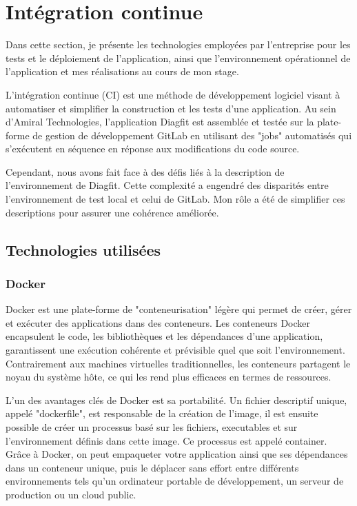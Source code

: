 \newpage
\section{Intégration continue}
Dans cette section, je présente les technologies employées par l'entreprise pour les tests et le déploiement de l'application, ainsi que l'environnement opérationnel de l'application et mes réalisations au cours de mon stage.

L'intégration continue (CI) est une méthode de développement logiciel visant à automatiser et simplifier la construction et les tests d'une application.
Au sein d'Amiral Technologies, l'application Diagfit est assemblée et testée sur la plate-forme de gestion de développement GitLab en utilisant des "jobs" automatisés qui s'exécutent en séquence en réponse aux modifications du code source.

Cependant, nous avons fait face à des défis liés à la description de l'environnement de Diagfit.
Cette complexité a engendré des disparités entre l'environnement de test local et celui de GitLab.
Mon rôle a été de simplifier ces descriptions pour assurer une cohérence améliorée.


\subsection{Technologies utilisées}
\subsubsection{Docker}
Docker est une plate-forme de "conteneurisation" légère qui permet de créer, gérer et exécuter des applications dans des conteneurs.
Les conteneurs Docker encapsulent le code, les bibliothèques et les dépendances d'une application, garantissent une exécution cohérente et prévisible quel que soit l'environnement.
Contrairement aux machines virtuelles traditionnelles, les conteneurs partagent le noyau du système hôte, ce qui les rend plus efficaces en termes de ressources.

L'un des avantages clés de Docker est sa portabilité.
Un fichier descriptif unique, appelé "dockerfile", est responsable de la création de l'image, il est ensuite possible de créer un processus basé sur les fichiers, executables et sur l'environnement définis dans cette image.
Ce processus est appelé container.
Grâce à Docker, on peut empaqueter votre application ainsi que ses dépendances dans un conteneur unique, puis le déplacer sans effort entre différents environnements tels qu'un ordinateur portable de développement, un serveur de production ou un cloud public.

